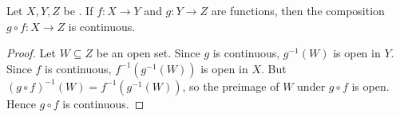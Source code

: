 \begin{proposition} \label{proposition:continuity_of_composition_of_continuous_functions}
    Let $X,Y,Z$ be . If $f : X \to Y$ and $g : Y \to Z$ are  functions, then the composition $g \circ f : X \to Z$ is continuous.
\end{proposition}
\begin{proof}
    Let $W \subseteq Z$ be an open set. Since $g$ is continuous, $g^{-1}(W)$ is open in $Y$. Since $f$ is continuous, $f^{-1}(g^{-1}(W))$ is open in $X$. But $(g \circ f)^{-1}(W) = f^{-1}(g^{-1}(W))$, so the preimage of $W$ under $g \circ f$ is open. Hence $g \circ f$ is continuous.
\end{proof}